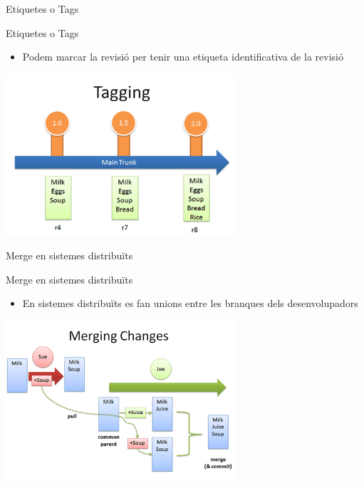 \documentclass[10pt,xcolor={rgb}]{beamer}
\begin{document}
    \begin{frame}[fragile]{Etiquetes o Tags}
      
            \begin{block}{Etiquetes o Tags}
      
              \begin{itemize}
                \item Podem marcar la revisió per tenir una etiqueta identificativa de la revisió
                
              \end{itemize}

              \centering
              \includegraphics[height=6cm]{tagging.png}
      
            \end{block}
      
    \end{frame}

    \begin{frame}[fragile]{Merge en sistemes distribuïts}
      
            \begin{block}{Merge en sistemes distribuïts}
      
              \begin{itemize}
                \item En sistemes distribuïts es fan unions entre les branques dels desenvolupadors
                
              \end{itemize}

              \centering
              \includegraphics[height=6cm]{distributed_merge.png}
      
            \end{block}
      
    \end{frame}  
\end{document}
